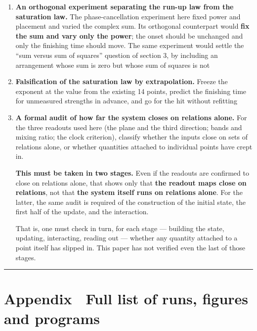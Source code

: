 \documentclass[
]{article}
\begin{document}
\begin{enumerate}
\def\labelenumi{\arabic{enumi}.}
\setcounter{enumi}{7}
\item
  \textbf{An orthogonal experiment separating the run-up law from the
  saturation law.} The phase-cancellation experiment here fixed power
  and placement and varied the complex sum. Its orthogonal counterpart
  would \textbf{fix the sum and vary only the power}; the onset should
  be unchanged and only the finishing time should move. The same
  experiment would settle the ``sum versus sum of squares'' question of
  section 3, by including an arrangement whose sum is zero but whose sum
  of squares is not
\item
  \textbf{Falsification of the saturation law by extrapolation.} Freeze
  the exponent at the value from the existing 14 points, predict the
  finishing time for unmeasured strengths in advance, and go for the hit
  without refitting
\item
  \textbf{A formal audit of how far the system closes on relations
  alone.} For the three readouts used here (the plane and the third
  direction; bands and mixing ratio; the clock criterion), classify
  whether the inputs close on sets of relations alone, or whether
  quantities attached to individual points have crept in.

  \textbf{This must be taken in two stages.} Even if the readouts are
  confirmed to close on relations alone, that shows only that
  \textbf{the readout maps close on relations}, not that \textbf{the
  system itself runs on relations alone}. For the latter, the same audit
  is required of the construction of the initial state, the first half
  of the update, and the interaction.

  That is, one must check in turn, for each stage --- building the
  state, updating, interacting, reading out --- whether any quantity
  attached to a point itself has slipped in. This paper has not verified
  even the last of those stages.
\end{enumerate}

\begin{center}\rule{0.5\linewidth}{0.5pt}\end{center}

\section{Appendix　Full list of runs, figures and
programs}\label{appendix-full-list-of-runs-figures-and-programs}
\end{document}
